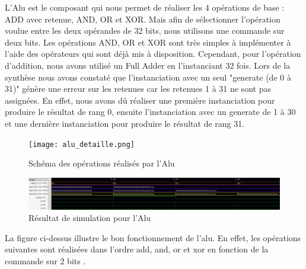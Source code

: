\documentclass[10pt,a4paper]{article}
\begin{document}
			L'Alu est le composant qui nous permet de réaliser les 4 opérations de base : ADD avec retenue, 
			AND, OR et XOR. Mais afin de sélectionner l'opération voulue entre les deux opérandes de 32 bits, 
			nous utilisons une commande sur deux bits. Les opérations AND, OR et XOR sont très simples à 
			implémenter à l'aide des opérateurs qui sont déjà mis à disposition. Cependant, pour l'opération 
			d'addition, nous avons utilisé un Full Adder en l'instanciant 32 fois. Lors de la synthèse nous 						avons constaté que l'instanciation avec un seul "generate (de 0 à 31)" génère une erreur sur les 
			retenues car les retenues 1 à 31 ne sont pas assignées. En effet, nous avons dû réaliser une
			première instanciation pour produire le résultat de rang 0, ensuite l'instanciation avec un
			generate de 1 à 30 et une dernière instanciation pour produire le résultat de rang 31.
			
			\begin{figure}[H]															%
				\centering 																%
				\texttt{[image: alu\_detaille.png]} 				%
				\caption{Schéma des opérations réalisés par l'Alu} 						%
				\label{Fig.main2} 														%
			\end{figure}
			
			\newpage
			
			\begin{figure}[H]															%
				\centering 																%
				\includegraphics[width=1.0\textwidth]{alu_gtkwave.png}					%
				\caption{Résultat de simulation pour l'Alu} 							%
				\label{Fig.main2} 														%
			\end{figure}
			
			La figure ci-dessus illustre le bon fonctionnement de l’alu. En effet, les opérations suivantes 
			sont réalisées dans l’ordre add, and, or et xor en fonction de la commande sur 2 bits . 

			
\end{document}
